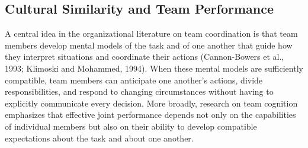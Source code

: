 \documentclass[10pt]{article}
\begin{document}
 
 


 
\subsection{Cultural Similarity and Team Performance}
A central idea in the organizational literature on team coordination is that team members develop mental models of the task and of one another that guide how they interpret situations and coordinate their actions (Cannon-Bowers et al., 1993; Klimoski and Mohammed, 1994). When these mental models are sufficiently compatible, team members can anticipate one another’s actions, divide responsibilities, and respond to changing circumstances without having to explicitly communicate every decision.  More broadly, research on team cognition emphasizes that effective joint performance depends not only on the capabilities of individual members but also on their ability to develop compatible expectations about the task and about one another.
\end{document}
